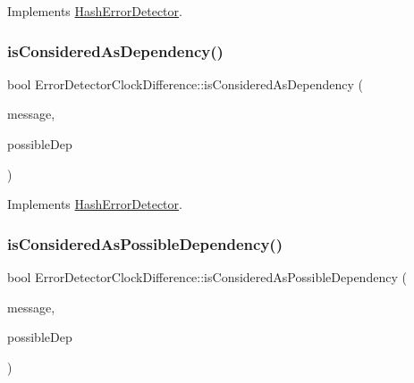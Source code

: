 Implements \hyperlink{class_hash_error_detector_a5b9f7e8a6f63b1582e912102021c2d8d}{Hash\+Error\+Detector}.

\mbox{\label{class_error_detector_clock_difference_a4d399849b1872d3273fa757ee9dc9bd9}} 
\subsubsection{\texorpdfstring{is\+Considered\+As\+Dependency()}{isConsideredAsDependency()}}
{\footnotesize\ttfamily bool Error\+Detector\+Clock\+Difference\+::is\+Considered\+As\+Dependency (\begin{DoxyParamCaption}\item[{const \hyperlink{structures_8h_a7e7bdc1d2fff8a9436f2f352b2711ed6}{message\+Info} \&}]{message,  }\item[{const \hyperlink{structures_8h_a7e7bdc1d2fff8a9436f2f352b2711ed6}{message\+Info} \&}]{possible\+Dep }\end{DoxyParamCaption})\hspace{0.3cm}{\ttfamily [virtual]}}



Implements \hyperlink{class_hash_error_detector_a4693d4d5e327b19f75088cef52bcad7d}{Hash\+Error\+Detector}.

\mbox{\label{class_error_detector_clock_difference_ab20aa1671eb558dea6f06b2440e97e41}} 
\subsubsection{\texorpdfstring{is\+Considered\+As\+Possible\+Dependency()}{isConsideredAsPossibleDependency()}}
{\footnotesize\ttfamily bool Error\+Detector\+Clock\+Difference\+::is\+Considered\+As\+Possible\+Dependency (\begin{DoxyParamCaption}\item[{const \hyperlink{structures_8h_a7e7bdc1d2fff8a9436f2f352b2711ed6}{message\+Info} \&}]{message,  }\item[{const \hyperlink{structures_8h_a7e7bdc1d2fff8a9436f2f352b2711ed6}{message\+Info} \&}]{possible\+Dep }\end{DoxyParamCaption})\hspace{0.3cm}{\ttfamily [virtual]}}



